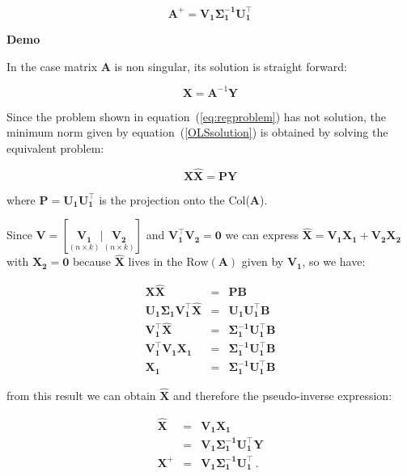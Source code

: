 \begin{equation}
\label{eq:pseudoinversesvd}
\mathbf{A}^+ = \mathbf{V_1\Sigma_1^{-1}U_1^\top}
\end{equation}

\textbf{Demo}\quad

In the case matrix $\mathbf{A}$ is non singular, its solution is
straight forward:

\begin{equation}
\label{OLSsolution}
    \mathbf{\mathbf{X}}=\mathbf{A}^{-1}\mathbf{Y}
\end{equation}


Since the problem shown in equation~(\ref{eq:regproblem}) has not
solution, the minimum norm given by equation~(\ref{OLSsolution}) is
obtained by solving the equivalent problem:

\begin{equation*}
\label{eq:proyectorsol}
\mathbf{X \hat{\mathbf{X}} = PY} 
\end{equation*}


\noindent where $\mathbf{P=U_1 U_1^\top}$ is the projection onto the
Col($\mathbf{A}$). 

Since $\mathbf{V} = [\underset{(n \times k)}{\mathbf{V_1}} |
\underset{(n \times k)}{\mathbf{V_2}}]$ and $\mathbf{V_1^\top V_2 =
0}$ we can express $\mathbf{\hat{\mathbf{X}}} = \mathbf{V_1 \mathbf{X}_1 + V_2 \mathbf{X}_2}$
with $\mathbf{\mathbf{X}_2=0}$ because $\mathbf{\hat{\mathbf{X}}}$ lives in the
$\text{Row}(\mathbf{A})$ given by $\mathbf{V_1}$, so we have:

\begin{eqnarray*}
\mathbf{X \hat{\mathbf{X}}} &=& \mathbf{PB} \\
\mathbf{U_1 \Sigma_1 V_1^\top \hat{\mathbf{X}}} &=& \mathbf{U_1 U_1^\top B} \\
\mathbf{ V_1^\top \hat{\mathbf{X}}} &=&  \mathbf{\Sigma_1^{-1} U_1^\top B} \\ 
\mathbf{ V_1^\top V_1 \mathbf{X}_1} &=& \mathbf{\Sigma_1^{-1}
U_1^\top B} \\
\mathbf{\mathbf{X}_1}&=& \mathbf{\Sigma_1^{-1} U_1^\top B}
\end{eqnarray*}

\noindent from this result we can obtain $\mathbf{\hat{\mathbf{X}}}$ and
therefore the pseudo-inverse expression:

\begin{eqnarray*}
\mathbf{\hat{\mathbf{X}}} &=& \mathbf{V_1 \mathbf{X}_1} \\
                &=& \mathbf{V_1 \Sigma_1^{-1} U_1^\top Y} \\
\mathbf{X^+} &=& \mathbf{V_1 \Sigma_1^{-1} U_1^\top} \, .
\end{eqnarray*}

